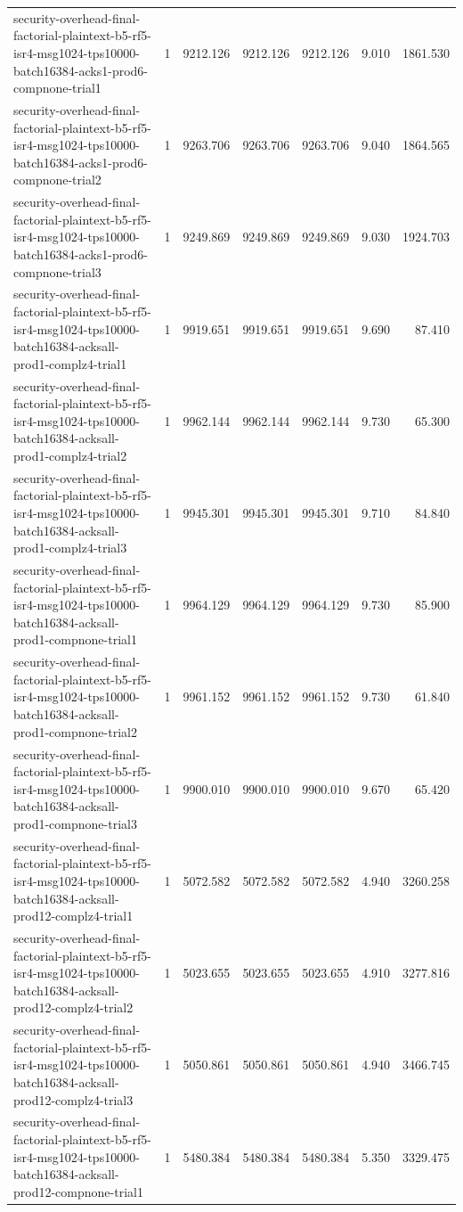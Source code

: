 \begin{tabular}{lrrrrrr}
security-overhead-final-factorial-plaintext-b5-rf5-isr4-msg1024-tps10000-batch16384-acks1-prod6-compnone-trial1 & 1 & 9212.126 & 9212.126 & 9212.126 & 9.010 & 1861.530 \\
security-overhead-final-factorial-plaintext-b5-rf5-isr4-msg1024-tps10000-batch16384-acks1-prod6-compnone-trial2 & 1 & 9263.706 & 9263.706 & 9263.706 & 9.040 & 1864.565 \\
security-overhead-final-factorial-plaintext-b5-rf5-isr4-msg1024-tps10000-batch16384-acks1-prod6-compnone-trial3 & 1 & 9249.869 & 9249.869 & 9249.869 & 9.030 & 1924.703 \\
security-overhead-final-factorial-plaintext-b5-rf5-isr4-msg1024-tps10000-batch16384-acksall-prod1-complz4-trial1 & 1 & 9919.651 & 9919.651 & 9919.651 & 9.690 & 87.410 \\
security-overhead-final-factorial-plaintext-b5-rf5-isr4-msg1024-tps10000-batch16384-acksall-prod1-complz4-trial2 & 1 & 9962.144 & 9962.144 & 9962.144 & 9.730 & 65.300 \\
security-overhead-final-factorial-plaintext-b5-rf5-isr4-msg1024-tps10000-batch16384-acksall-prod1-complz4-trial3 & 1 & 9945.301 & 9945.301 & 9945.301 & 9.710 & 84.840 \\
security-overhead-final-factorial-plaintext-b5-rf5-isr4-msg1024-tps10000-batch16384-acksall-prod1-compnone-trial1 & 1 & 9964.129 & 9964.129 & 9964.129 & 9.730 & 85.900 \\
security-overhead-final-factorial-plaintext-b5-rf5-isr4-msg1024-tps10000-batch16384-acksall-prod1-compnone-trial2 & 1 & 9961.152 & 9961.152 & 9961.152 & 9.730 & 61.840 \\
security-overhead-final-factorial-plaintext-b5-rf5-isr4-msg1024-tps10000-batch16384-acksall-prod1-compnone-trial3 & 1 & 9900.010 & 9900.010 & 9900.010 & 9.670 & 65.420 \\
security-overhead-final-factorial-plaintext-b5-rf5-isr4-msg1024-tps10000-batch16384-acksall-prod12-complz4-trial1 & 1 & 5072.582 & 5072.582 & 5072.582 & 4.940 & 3260.258 \\
security-overhead-final-factorial-plaintext-b5-rf5-isr4-msg1024-tps10000-batch16384-acksall-prod12-complz4-trial2 & 1 & 5023.655 & 5023.655 & 5023.655 & 4.910 & 3277.816 \\
security-overhead-final-factorial-plaintext-b5-rf5-isr4-msg1024-tps10000-batch16384-acksall-prod12-complz4-trial3 & 1 & 5050.861 & 5050.861 & 5050.861 & 4.940 & 3466.745 \\
security-overhead-final-factorial-plaintext-b5-rf5-isr4-msg1024-tps10000-batch16384-acksall-prod12-compnone-trial1 & 1 & 5480.384 & 5480.384 & 5480.384 & 5.350 & 3329.475 \\

\end{tabular}
